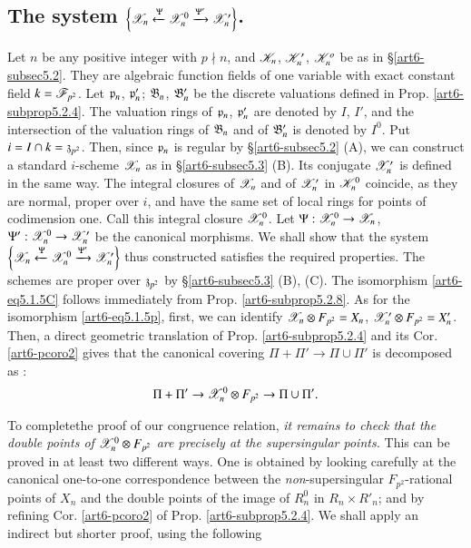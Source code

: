 \subsection{The system $\left\{\mathscr{X}_n \xleftarrow{\Psi} \mathscr{X}^0_n \xrightarrow{\Psi'} \mathscr{X}'_n \right\}$.}\label{art6-subsec5.4}
Let $n$ be any positive integer with $p \nmid n$, and $\mathscr{K}_n$, $\mathscr{K}'_n$, $\mathscr{K}^o_n$ be as in \S \ref{art6-subsec5.2}. They are algebraic function fields of one variable with exact constant field $k = \mathscr{F}_{p^2}$. Let $\mathfrak{p}_n$, $\mathfrak{p}'_n$; $\mathfrak{B}_n$, $\mathfrak{B}'_n$ be the discrete valuations defined in Prop. \ref{art6-subprop5.2.4}. The valuation rings of $\mathfrak{p}_n$, $\mathfrak{p}'_n$ are denoted by $I$, $I'$, and the intersection of the valuation rings of $\mathfrak{B}_n$ and of $\mathfrak{B}'_n$ is denoted by $I^0$. Put $i = I \cap k = \mathfrak{z}_{p^2}$. Then, since $\mathfrak{p}_n$ is regular by \S \ref{art6-subsec5.2} (A), we can construct a standard $i$-scheme $\mathscr{X}_n$ as in \S \ref{art6-subsec5.3} (B). Its conjugate $\mathscr{X}'_n$ is defined in the same way. The integral closures of $\mathscr{X}_n$ and of $\mathscr{X}'_n$ in $\mathscr{K}^0_n$ coincide, as they are normal, proper over $i$, and have the same set of local rings for points of codimension one. Call this integral closure $\mathscr{X}^0_n$. Let $\Psi : \mathscr{X}^0_n \to \mathscr{X}_n$, $\Psi' : \mathscr{X}^0_n \to \mathscr{X}'_n$ be the canonical morphisms. We shall show that the system $\left\{\mathscr{X}_n \xleftarrow{\Psi} \mathscr{X}^0_n \xrightarrow{\Psi'} \mathscr{X}'_n \right\}$ thus constructed satisfies the required properties. The schemes are proper over $\mathfrak{z}_{p^2}$ by \S \ref{art6-subsec5.3} (B), (C). The isomorphism \eqref{art6-eq5.1.5C} follows immediately from Prop. \ref{art6-subprop5.2.8}. As for the isomorphism \eqref{art6-eq5.1.5p}, first, we can identify $\mathscr{X}_n \otimes F_{p^2} = X_n$, $\mathscr{X}'_n \otimes F_{p^2} = X'_n$. Then, a direct geometric translation of Prop. \ref{art6-subprop5.2.4} and its Cor. \ref{art6-pcoro2} gives that the canonical covering $\Pi + \Pi' \to \Pi \cup \Pi'$ is decomposed as :
\setcounter{equation}{0}
\begin{equation}
\Pi + \Pi ' \to \mathscr{X}^0_n \otimes F_{p^2} \to \Pi \cup \Pi'. \label{art6-eq5.4.1}
\end{equation}

To complete\pageoriginale the proof of our congruence relation, \textit{it remains to check that the double points of $\mathscr{X}^0_n \otimes F_{p^2}$ are precisely at the supersingular points.} This can be proved in at least two different ways. One is obtained by looking carefully at the canonical one-to-one correspondence between the \textit{non}-supersingular $F_{p^2}$-rational points of $X_n$ and the double points of the image of $R^0_n$ in $R_n \times R'_n$; and by refining Cor. \ref{art6-pcoro2} of Prop. \ref{art6-subprop5.2.4}. We shall apply an indirect but shorter proof, using the following

